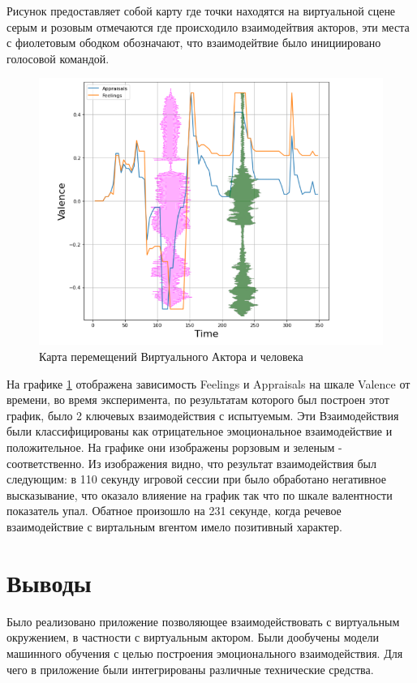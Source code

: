 Рисунок предоставляет собой карту где точки находятся на виртуальной сцене 
серым и розовым отмечаются где происходило взаимодейтвия акторов, эти 
места с фиолетовым ободком обозначают, что взаимодейтвие было инициировано
голосовой командой.

\begin{figure}[h]
\includegraphics[width=0.75\columnwidth]{./img/GRAFIK.png}
\centering
\caption{Карта перемещений Виртуального Актора и человека}
\label{pic:grafik_res}
\end{figure}

На графике \ref{pic:grafik_res} отображена зависимость Feelings и Appraisals
на шкале Valence от времени, во время эксперимента, по результатам которого 
был построен этот график, было 2 ключевых взаимодействия с испытуемым. Эти
Взаимодействия были классифицированы как отрицательное эмоциональное взаимодействие и положительное.
На графике они изображены рорзовым и зеленым - соответственно.
Из изображения видно, что результат взаимодействия был следующим:
в 110 секунду игровой сессии при было обработано негативное высказывание, что 
оказало влияение на график так что по шкале валентности показатель упал.
Обатное произошло на 231 секунде, когда речевое взаимодействие с виртальным 
вгентом имело позитивный характер.

\section{Выводы}

Было реализовано приложение позволяющее взаимодействовать с виртуальным окружением, в частности с виртуальным актором. 
Были дообучены модели машинного обучения с целью построения эмоционального взаимодействия. 
Для чего в приложение были интегрированы различные технические средства.
